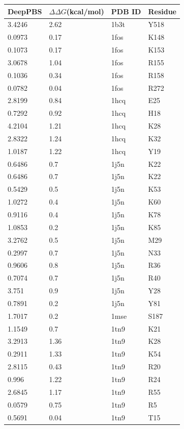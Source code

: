 \begin{table}[]
\small
\begin{tabular}{|l|l|l|l|}
\hline
\textbf{DeepPBS} & \textbf{$\Delta\Delta G$(kcal/mol)} & \textbf{PDB ID} & \textbf{Residue} \\
\hline
3.4246 & 2.62 & 1b3t & Y518 \\
0.0973 & 0.17 & 1fos & K148 \\
0.1073 & 0.17 & 1fos & K153 \\
3.0678 & 1.04 & 1fos & R155 \\
0.1036 & 0.34 & 1fos & R158 \\
0.0782 & 0.04 & 1fos & R272 \\
2.8199 & 0.84 & 1hcq & E25 \\
0.7292 & 0.92 & 1hcq & H18 \\
4.2104 & 1.21 & 1hcq & K28 \\
2.8322 & 1.24 & 1hcq & K32 \\
1.0187 & 1.22 & 1hcq & Y19 \\
0.6486 & 0.7 & 1j5n & K22 \\
0.6486 & 0.7 & 1j5n & K22 \\
0.5429 & 0.5 & 1j5n & K53 \\
1.0272 & 0.4 & 1j5n & K60 \\
0.9116 & 0.4 & 1j5n & K78 \\
1.0853 & 0.2 & 1j5n & K85 \\
3.2762 & 0.5 & 1j5n & M29 \\
0.2997 & 0.7 & 1j5n & N33 \\
0.9606 & 0.8 & 1j5n & R36 \\
0.7074 & 0.7 & 1j5n & R40 \\
3.751 & 0.9 & 1j5n & Y28 \\
0.7891 & 0.2 & 1j5n & Y81 \\
1.7017 & 0.2 & 1mse & S187 \\
1.1549 & 0.7 & 1tn9 & K21 \\
3.2913 & 1.36 & 1tn9 & K28 \\
0.2911 & 1.33 & 1tn9 & K54 \\
2.8115 & 0.43 & 1tn9 & R20 \\
0.996 & 1.22 & 1tn9 & R24 \\
2.6845 & 1.17 & 1tn9 & R55 \\
0.0579 & 0.75 & 1tn9 & R5 \\
0.5691 & 0.04 & 1tn9 & T15 \\

\end{tabular}
\end{table}
